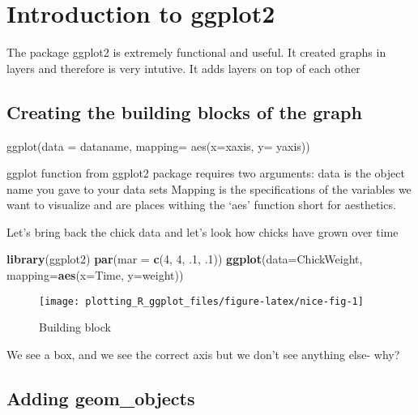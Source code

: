 \documentclass[
]{book}
\newenvironment{Shaded}{\begin{snugshade}}{\end{snugshade}}
\newcommand{\DataTypeTok}[1]{\textcolor[rgb]{0.13,0.29,0.53}{#1}}
\newcommand{\DecValTok}[1]{\textcolor[rgb]{0.00,0.00,0.81}{#1}}
\newcommand{\FloatTok}[1]{\textcolor[rgb]{0.00,0.00,0.81}{#1}}
\newcommand{\KeywordTok}[1]{\textcolor[rgb]{0.13,0.29,0.53}{\textbf{#1}}}
\newcommand{\NormalTok}[1]{#1}
\begin{document}
\hypertarget{introduction-to-ggplot2}{%
\chapter{Introduction to ggplot2}\label{introduction-to-ggplot2}}

The package ggplot2 is extremely functional and useful. It created graphs in layers and therefore is very intutive. It adds layers on top of each other

\hypertarget{creating-the-building-blocks-of-the-graph}{%
\section{Creating the building blocks of the graph}\label{creating-the-building-blocks-of-the-graph}}

ggplot(data = dataname, mapping= aes(x=xaxis, y= yaxis))

ggplot function from ggplot2 package requires two arguments:
data is the object name you gave to your data sets
Mapping is the specifications of the variables we want to visualize and are places withing the `aes' function short for aesthetics.

Let's bring back the chick data and let's look how chicks have grown over time

\begin{Shaded}
\begin{Highlighting}[]
\KeywordTok{library}\NormalTok{(ggplot2)}
\KeywordTok{par}\NormalTok{(}\DataTypeTok{mar =} \KeywordTok{c}\NormalTok{(}\DecValTok{4}\NormalTok{, }\DecValTok{4}\NormalTok{, }\FloatTok{.1}\NormalTok{, }\FloatTok{.1}\NormalTok{))}
\KeywordTok{ggplot}\NormalTok{(}\DataTypeTok{data=}\NormalTok{ChickWeight, }\DataTypeTok{mapping=}\KeywordTok{aes}\NormalTok{(}\DataTypeTok{x=}\NormalTok{Time, }\DataTypeTok{y=}\NormalTok{weight))}
\end{Highlighting}
\end{Shaded}

\begin{figure}

{\centering \texttt{[image: plotting\_R\_ggplot\_files/figure-latex/nice-fig-1]} 

}

\caption{Building block}\label{fig:nice-fig}
\end{figure}

We see a box, and we see the correct axis but we don't see anything else- why?

\hypertarget{adding-geom_objects}{%
\section{Adding geom\_objects}\label{adding-geom_objects}}
\end{document}

